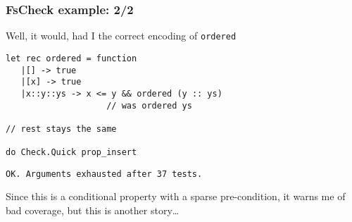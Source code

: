 \documentclass{beamer}
\begin{document}
\begin{frame}[fragile]
  \frametitle{FsCheck example: 2/2}
Well, it would, had I the correct encoding of \texttt{ordered}
  \begin{small}
    \begin{lstlisting}
let rec ordered = function                      
   |[] -> true
   |[x] -> true
   |x::y::ys -> x <= y && ordered (y :: ys) 
                    // was ordered ys  
 
// rest stays the same

do Check.Quick prop_insert
 \end{lstlisting}
  \end{small}
  \pause
    \begin{small}
    \begin{lstlisting}
OK. Arguments exhausted after 37 tests.
    \end{lstlisting}
  \end{small}
  Since this is a conditional property with a  sparse pre-condition, it
  warns me of bad coverage, but this is another story\dots
\end{frame}







\end{document}
